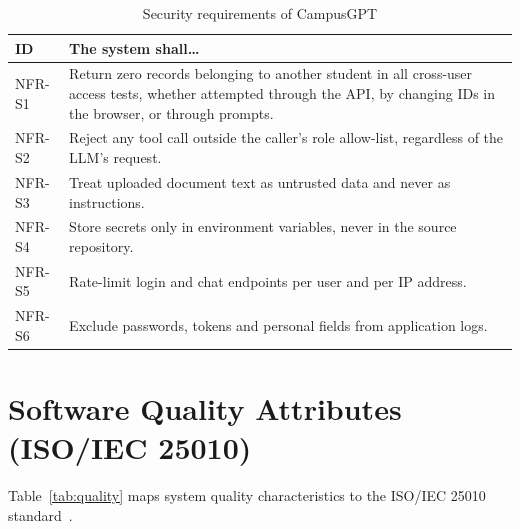 \documentclass[11pt,a4paper,oneside]{report}
\begin{document}
\begin{table}[H]
\centering
\caption{Security requirements of CampusGPT}
\label{tab:sec}
\begin{tabularx}{\textwidth}{@{}lY@{}}
\toprule
\textbf{ID} & \textbf{The system shall\ldots}\\
\midrule
NFR-S1 & Return zero records belonging to another student in all cross-user access tests,
whether attempted through the API, by changing IDs in the browser, or through prompts.\\
NFR-S2 & Reject any tool call outside the caller's role allow-list, regardless of the LLM's
request.\\
NFR-S3 & Treat uploaded document text as untrusted data and never as instructions.\\
NFR-S4 & Store secrets only in environment variables, never in the source repository.\\
NFR-S5 & Rate-limit login and chat endpoints per user and per IP address.\\
NFR-S6 & Exclude passwords, tokens and personal fields from application logs.\\
\bottomrule
\end{tabularx}
\end{table}

\section{Software Quality Attributes (ISO/IEC 25010)}
Table~\ref{tab:quality} maps system quality characteristics to the ISO/IEC 25010
standard~\cite{iso25010}.
\end{document}
